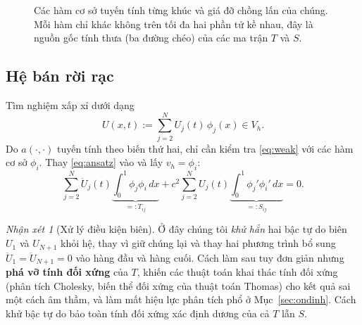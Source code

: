 \documentclass[11pt,a4paper]{article}
\theoremstyle{plain}
\theoremstyle{definition}
\theoremstyle{remark}
\newtheorem{remark}[theorem]{Nhận xét}
\newcommand{\Vh}{V_{h}}
\begin{document}
\begin{figure}[H]
\centering
{}
\caption{Các hàm cơ sở tuyến tính từng khúc và giá đỡ chồng lấn của chúng.
Mỗi hàm chỉ khác không trên tối đa hai phần tử kề nhau, đây là nguồn gốc
tính thưa (ba đường chéo) của các ma trận $T$ và $S$.}
\label{fig:basis}
\end{figure}

\subsection{Hệ bán rời rạc}

Tìm nghiệm xấp xỉ dưới dạng
\begin{equation}
\label{eq:ansatz}
  U(x,t) := \sum_{j=2}^{N} U_{j}(t)\,\phi_{j}(x) \in \Vh .
\end{equation}
Do $a(\cdot,\cdot)$ tuyến tính theo biến thứ hai, chỉ cần kiểm tra
\eqref{eq:weak} với các hàm cơ sở $\phi_{i}$. Thay \eqref{eq:ansatz} vào và
lấy $v_{h} = \phi_{i}$:
\begin{equation}
\label{eq:semi-sum}
  \sum_{j=2}^{N} \ddot{U}_{j}(t)
     \underbrace{\int_{0}^{1}\phi_{j}\phi_{i}\,dx}_{=: T_{ij}}
  + c^{2}\sum_{j=2}^{N} U_{j}(t)
     \underbrace{\int_{0}^{1}\phi_{j}'\phi_{i}'\,dx}_{=: S_{ij}} = 0 .
\end{equation}

\begin{remark}[Xử lý điều kiện biên]
\label{rem:bc}
Ở đây chúng tôi \emph{khử hẳn} hai bậc tự do biên $U_{1}$ và $U_{N+1}$ khỏi
hệ, thay vì giữ chúng lại và thay hai phương trình bổ sung
$\ddot{U}_{1} = \ddot{U}_{N+1} = 0$ vào hàng đầu và hàng cuối. Cách làm sau
tuy đơn giản nhưng \textbf{phá vỡ tính đối xứng} của $T$, khiến các thuật
toán khai thác tính đối xứng (phân tích Cholesky, biến thể đối xứng của
thuật toán Thomas) cho kết quả sai một cách âm thầm, và làm mất hiệu lực
phân tích phổ ở Mục~\ref{sec:ondinh}. Cách khử bậc tự do bảo toàn tính đối xứng
xác định dương của cả $T$ lẫn $S$.
\end{remark}
\end{document}
